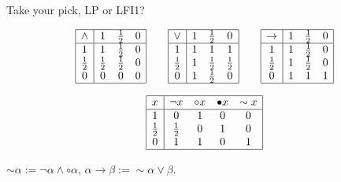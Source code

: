 \documentclass[aspectratio=169,11pt]{beamer}
\begin{document}
\begin{frame}{Take your pick, LP or LFI1?}
\centering
\vspace{-.6cm}
\renewcommand{\arraystretch}{1.35}
\setlength{\arraycolsep}{6pt}

\[
\begin{array}{|c|ccc|}
\hline
\land & 1 & \tfrac12 & 0 \\ \hline
1        & 1        & \tfrac12 & 0 \\
\tfrac12 & \tfrac12 & \tfrac12 & 0 \\
0        & 0        & 0        & 0 \\ \hline
\end{array}
\qquad
\begin{array}{|c|ccc|}
\hline
\lor & 1 & \tfrac12 & 0 \\ \hline
1        & 1 & 1        & 1        \\
\tfrac12 & 1 & \tfrac12 & \tfrac12 \\
0        & 1 & \tfrac12 & 0        \\ \hline
\end{array}
\qquad
\begin{array}{|c|ccc|}
\hline
\to & 1 & \tfrac12 & 0 \\ \hline
1        & 1 & \tfrac12 & 0 \\
\tfrac12 & 1 & \tfrac12 & 0 \\
0        & 1 & 1        & 1 \\ \hline
\end{array}
\]

\medskip

\[
\begin{array}{|c|cccc|}
\hline
x & \neg x & \circ x & \bullet x & \sim x \\ \hline
1        & 0        & 1 & 0 & 0 \\
\tfrac12 & \tfrac12 & 0 & 1 & 0 \\
0        & 1        & 1 & 0 & 1 \\ \hline
\end{array}
\]

\medskip
{\small
$\sim\alpha := \neg\alpha\land\circ\alpha$,
\qquad
$\alpha\to\beta := \sim\alpha\lor\beta$.
}

\end{frame}
\end{document}
